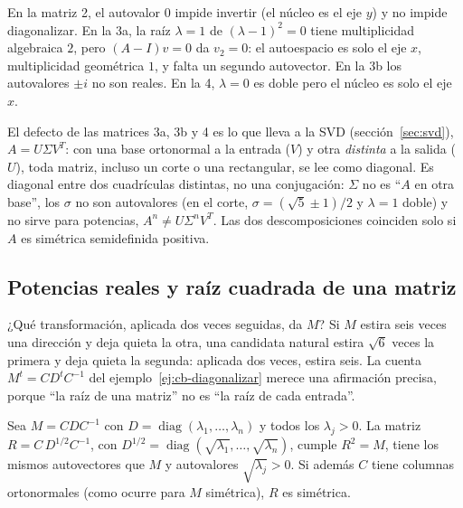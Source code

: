 \begin{resultado}
En la matriz 2, el autovalor \(0\) impide invertir (el núcleo es el eje \(y\)) y no impide
diagonalizar. En la 3a, la raíz \(\lambda=1\) de \((\lambda-1)^2=0\) tiene multiplicidad
algebraica \(2\), pero \((A-I)v=0\) da \(v_2=0\): el autoespacio es solo el eje \(x\),
multiplicidad geométrica \(1\), y falta un segundo autovector. En la 3b los autovalores
\(\pm i\) no son reales. En la 4, \(\lambda=0\) es doble pero el núcleo es solo el eje \(x\).

El defecto de las matrices 3a, 3b y 4 es lo que lleva a la SVD (sección~\ref{sec:svd}), \(A=U\Sigma V^T\): con una base ortonormal a la entrada (\(V\)) y otra
\emph{distinta} a la salida (\(U\)), toda matriz, incluso un corte o una rectangular, se
lee como diagonal. Es diagonal entre dos cuadrículas distintas, no una conjugación: \(\Sigma\) no
es \enquote{\(A\) en otra base}, los \(\sigma\) no son autovalores (en el corte,
\(\sigma=(\sqrt5\pm1)/2\) y \(\lambda=1\) doble) y no sirve para potencias,
\(A^n\neq U\Sigma^nV^T\). Las dos descomposiciones coinciden solo si \(A\) es simétrica
semidefinida positiva.
\end{resultado}

\subsection{Potencias reales y raíz cuadrada de una matriz}\label{sec:raiz-matriz}

¿Qué transformación, aplicada dos veces seguidas, da \(M\)? Si \(M\) estira seis veces una
dirección y deja quieta la otra, una candidata natural estira \(\sqrt6\) veces la primera y
deja quieta la segunda: aplicada dos veces, estira seis. La cuenta \(M^t=CD^tC^{-1}\) del
ejemplo~\ref{ej:cb-diagonalizar} merece una afirmación
precisa, porque \enquote{la raíz de una matriz} no es \enquote{la raíz de cada entrada}.

\begin{proposicion}\label{prop:cb-raiz}
Sea \(M=CDC^{-1}\) con \(D=\operatorname{diag}(\lambda_1,\dots,\lambda_n)\) y todos los
\(\lambda_j>0\). La matriz \(R=C\,D^{1/2}C^{-1}\), con
\(D^{1/2}=\operatorname{diag}(\sqrt{\lambda_1},\dots,\sqrt{\lambda_n})\), cumple \(R^2=M\),
tiene los mismos autovectores que \(M\) y autovalores \(\sqrt{\lambda_j}>0\). Si además \(C\)
tiene columnas ortonormales (como ocurre para \(M\) simétrica), \(R\) es simétrica.
\end{proposicion}


